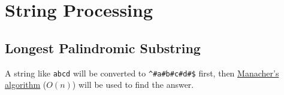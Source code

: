 \section{String Processing} %

\subsection{Longest Palindromic Substring} %
A string like {\tt abcd} will be converted to {\tt \^{}\#a\#b\#c\#d\#\$} first, then \href{http://en.wikipedia.org/wiki/Longest_palindromic_substring#Manacher.27s_Algorithm_for_Finding_a_Longest_Palindrome_in_a_String}{Manacher's algorithm} ($O(n)$) will be used to find the answer.


